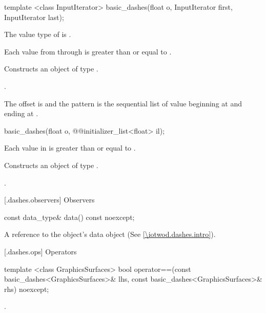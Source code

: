 %
\begin{itemdecl}
template <class InputIterator>
basic_dashes(float o, InputIterator first, InputIterator last);
\end{itemdecl}
\begin{itemdescr}
\pnum
\requires
The value type of  is .

\pnum
Each value from  through  is greater than or equal to .

\pnum
\effects
Constructs an object of type .

\pnum
\postconditions
{}.

\pnum
\remarks
The offset is  and the pattern is the sequential list of value beginning at  and ending at .
\end{itemdescr}

%
\begin{itemdecl}
basic_dashes(float o, @\stdqualifier{}@initializer_list<float> il);
\end{itemdecl}
\begin{itemdescr}
\pnum
\requires
Each value in  is greater than or equal to .

\pnum
\effects
Constructs an object of type .

\pnum
\postconditions
{}.
\end{itemdescr}

 [\iotwod.dashes.observers] {Observers}

\begin{itemdecl}
const data_type& data() const noexcept;
\end{itemdecl}
\begin{itemdescr}
\pnum
\returns
A reference to the  object's data object (See \ref{\iotwod.dashes.intro}).
\end{itemdescr}

 [\iotwod.dashes.ops] {Operators}

\pnum
\begin{itemdecl}
template <class GraphicsSurfaces>
bool operator==(const basic_dashes<GraphicsSurfaces>& lhs,
  const basic_dashes<GraphicsSurfaces>& rhs) noexcept;
\end{itemdecl}
\begin{itemdescr}
\pnum
\returns
{}.
\end{itemdescr}

